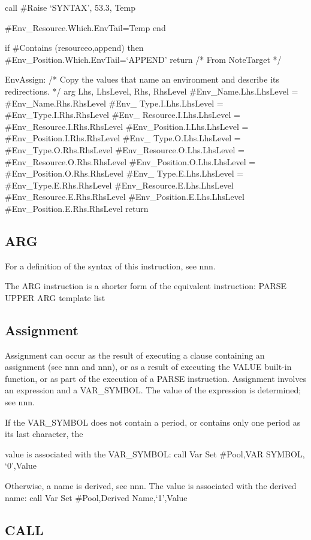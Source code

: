 call \#Raise `SYNTAX', 53.3, Temp

\#Env\_Resource.Which.EnvTail=Temp end

if \#Contains (resourceo,append) then
\#Env\_Position.Which.EnvTail=`APPEND' return /* From NoteTarget */

EnvAssign: /* Copy the values that name an environment and describe its
redirections. */ arg Lhs, LhsLevel, Rhs, RhsLevel
\#Env\_Name.Lhs.LhsLevel = \#Env\_Name.Rhs.RhsLevel \#Env\_
Type.I.Lhs.LhsLevel = \#Env\_Type.I.Rhs.RhsLevel \#Env\_
Resource.I.Lhs.LhsLevel = \#Env\_Resource.I.Rhs.RhsLevel
\#Env\_Position.I.Lhs.LhsLevel = \#Env\_Position.I.Rhs.RhsLevel \#Env\_
Type.O.Lhs.LhsLevel = \#Env\_Type.O.Rhs.RhsLevel
\#Env\_Resource.O.Lhs.LhsLevel = \#Env\_Resource.O.Rhs.RhsLevel
\#Env\_Position.O.Lhs.LhsLevel = \#Env\_Position.O.Rhs.RhsLevel \#Env\_
Type.E.Lhs.LhsLevel = \#Env\_Type.E.Rhs.RhsLevel
\#Env\_Resource.E.Lhs.LhsLevel \#Env\_Resource.E.Rhs.RhsLevel
\#Env\_Position.E.Lhs.LhsLevel \#Env\_Position.E.Rhs.RhsLevel return

\subsection{ARG}\label{arg}

For a definition of the syntax of this instruction, see nnn.

The ARG instruction is a shorter form of the equivalent instruction:
PARSE UPPER ARG template list

\subsection{Assignment}\label{assignment}

Assignment can occur as the result of executing a clause containing an
assignment (see nnn and nnn), or as a result of executing the VALUE
built-in function, or as part of the execution of a PARSE instruction.
Assignment involves an expression and a VAR\_SYMBOL. The value of the
expression is determined; see nnn.

If the VAR\_SYMBOL does not contain a period, or contains only one
period as its last character, the

value is associated with the VAR\_SYMBOL: call Var Set \#Pool,VAR
SYMBOL, `0',Value

Otherwise, a name is derived, see nnn. The value is associated with the
derived name: call Var Set \#Pool,Derived Name,`1',Value

\subsection{CALL}\label{call}

